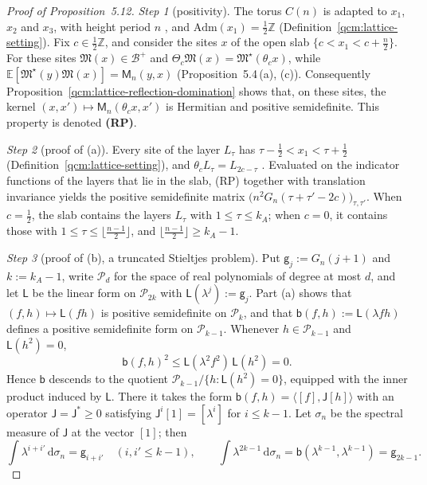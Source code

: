 \documentclass[11pt,letterpaper,reqno]{amsart}
\theoremstyle{definition}
\begin{document}
\begin{proof}[Proof of Proposition~5.12]
\emph{Step 1} (positivity).
The torus $C(n)$ is adapted to $x_1$, $x_2$ and $x_3$, with height period $n$ \cite[Section~2.6]{QEDConstruction}, and $\mathrm{Adm}(x_1)=\frac12\mathbb Z$ (Definition~\ref{qcm:lattice-setting}).
Fix $c\in\frac12\mathbb Z$, and consider the sites $x$ of the open slab $\{c<x_1<c+\frac n2\}$.
For these sites $\mathfrak M(x)\in\mathcal B^+$ and $\Theta_c\mathfrak M(x)=\mathfrak M^\star(\theta_cx)$, while $\mathbb E[\mathfrak M^\star(y)\mathfrak M(x)]=\mathsf M_n(y,x)$ (Proposition~5.4\,(a), (c)).
Consequently Proposition~\ref{qcm:lattice-reflection-domination} shows that, on these sites, the kernel $(x,x')\mapsto\mathsf M_n(\theta_cx,x')$ is Hermitian and positive semidefinite.
This property is denoted \textbf{(RP)}.

\emph{Step 2} (proof of (a)).
Every site of the layer $L_\tau$ has $\tau-\frac12<x_1<\tau+\frac12$ (Definition~\ref{qcm:lattice-setting}), and $\theta_cL_\tau=L_{2c-\tau}$ \cite[Proposition~2.1]{QEDConstruction}.
Evaluated on the indicator functions of the layers that lie in the slab, (RP) together with translation invariance yields the positive semidefinite matrix $\bigl(n^2G_n(\tau+\tau'-2c)\bigr)_{\tau,\tau'}$.
When $c=\frac12$, the slab contains the layers $L_\tau$ with $1\le\tau\le k_A$; when $c=0$, it contains those with $1\le\tau\le\lfloor\frac{n-1}2\rfloor$, and $\lfloor\frac{n-1}2\rfloor\ge k_A-1$.

\emph{Step 3} (proof of (b), a truncated Stieltjes problem).
Put $\mathsf g_j:=G_n(j+1)$ and $k:=k_A-1$, write $\mathcal P_d$ for the space of real polynomials of degree at most $d$, and let $\mathsf L$ be the linear form on $\mathcal P_{2k}$ with $\mathsf L(\lambda^j):=\mathsf g_j$.
Part (a) shows that $(f,h)\mapsto\mathsf L(fh)$ is positive semidefinite on $\mathcal P_k$, and that $\mathsf b(f,h):=\mathsf L(\lambda fh)$ defines a positive semidefinite form on $\mathcal P_{k-1}$.
Whenever $h\in\mathcal P_{k-1}$ and $\mathsf L(h^2)=0$,
\begin{equation*}
\mathsf b(f,h)^2\le\mathsf L(\lambda^2f^2)\,\mathsf L(h^2)=0.
\end{equation*}
Hence $\mathsf b$ descends to the quotient $\mathcal P_{k-1}/\{h:\mathsf L(h^2)=0\}$, equipped with the inner product induced by $\mathsf L$.
There it takes the form $\mathsf b(f,h)=\langle[f],\mathsf J[h]\rangle$ with an operator $\mathsf J=\mathsf J^*\ge0$ satisfying $\mathsf J^i[1]=[\lambda^i]$ for $i\le k-1$.
Let $\sigma_n$ be the spectral measure of $\mathsf J$ at the vector $[1]$; then
\begin{equation*}
\int\lambda^{i+i'}\,\mathrm d\sigma_n=\mathsf g_{i+i'}\quad(i,i'\le k-1),\qquad\int\lambda^{2k-1}\,\mathrm d\sigma_n=\mathsf b(\lambda^{k-1},\lambda^{k-1})=\mathsf g_{2k-1}.
\end{equation*}


\end{proof}
\end{document}
